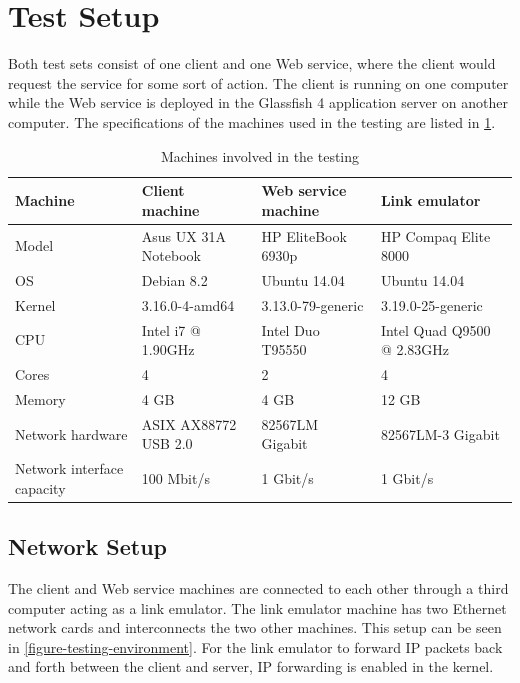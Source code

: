 \section{Test Setup}
\label{testing-environment}

Both test sets consist of one client and one Web service, where the client would
request the service for some sort of action. The client is running on one
computer while the Web service is deployed in the Glassfish 4 application
server on another computer. The specifications of the machines used in the
testing are listed in \cref{table-machines}.

\begin{table}[h]
\begin{tabularx}{\textwidth}{| X | X | X | X |}
\hline
  \textbf{Machine} & \textbf{Client machine} & \textbf{Web service machine} & \textbf{Link emulator}\\ \hline
  Model & Asus UX 31A Notebook & HP EliteBook 6930p & HP Compaq Elite 8000 \\ \hline
  OS & Debian 8.2 & Ubuntu 14.04 & Ubuntu 14.04\\ \hline
  Kernel & 3.16.0-4-amd64 & 3.13.0-79-generic & 3.19.0-25-generic\\ \hline
  CPU & Intel i7 @ 1.90GHz & Intel Duo T95550 & Intel Quad Q9500 @ 2.83GHz \\ \hline
  Cores & 4 & 2 & 4\\ \hline
  Memory & 4 GB & 4 GB & 12 GB\\ \hline
  Network hardware & ASIX AX88772 USB 2.0 & 82567LM Gigabit & 82567LM-3 Gigabit\\ \hline
  Network interface capacity & 100 Mbit/s & 1 Gbit/s & 1 Gbit/s \\ \hline
\end{tabularx}
\caption{Machines involved in the testing}
\label{table-machines}
\end{table}

\subsection{Network Setup}

The client and Web service machines are connected to each other through a third
computer acting as a link emulator. The link emulator machine has two Ethernet
network cards and interconnects the two other machines. This setup can be seen
in \cref{figure-testing-environment}. For the link emulator to forward IP
packets back and forth between the client and server, IP forwarding is enabled
in the kernel.

